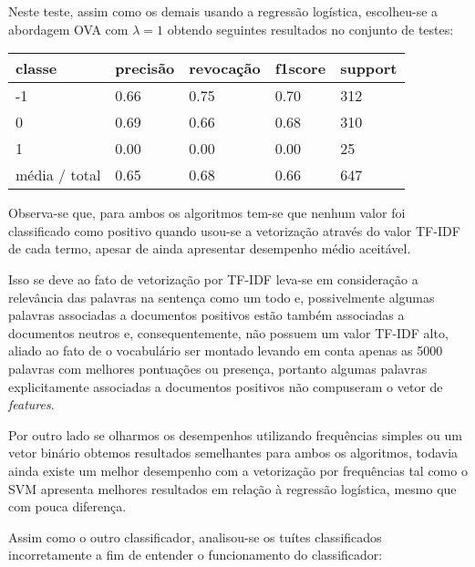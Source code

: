 Neste teste, assim como os demais usando a regressão logística, escolheu-se a abordagem OVA com
$\lambda = 1$ obtendo seguintes resultados no conjunto de testes:

\begin{table}[H]
	\centering
		\begin{tabular}{l | l | l | l | l}
		\hline
		classe  	&	precisão  &  revocação &  f1\-score &  support \\
		\hline
		 -1    &   0.66   &   0.75   &   0.70   &    312 \\
		 \hline
          0    &   0.69   &   0.66   &   0.68   &    310 \\
          \hline
          1    &   0.00   &   0.00   &   0.00    &    25 \\
		\hline
		média / total   &    0.65   &   0.68   &   0.66   &    647 \\
		\hline
	\end{tabular}
\end{table}

Observa-se que, para ambos os algoritmos tem-se que nenhum valor foi classificado como
positivo quando usou-se a vetorização através do valor TF-IDF de cada termo, apesar de ainda
apresentar desempenho médio aceitável. 

Isso se deve ao fato de vetorização por TF-IDF
leva-se em consideração a relevância das palavras na sentença como um todo e, possivelmente
algumas palavras associadas a documentos positivos estão também associadas
a documentos neutros e, consequentemente, não possuem um valor TF-IDF alto, aliado ao fato de o vocabulário
ser montado levando em conta apenas as 5000 palavras com melhores pontuações ou presença, portanto
algumas palavras explicitamente associadas a documentos positivos não compuseram o vetor de
\textit{features}.

Por outro lado se olharmos os desempenhos utilizando frequências simples ou um vetor binário
obtemos resultados semelhantes para ambos os algoritmos, todavia ainda existe um melhor desempenho
com a vetorização por frequências tal como o SVM apresenta melhores resultados em relação à regressão
logística, mesmo que com pouca diferença.

Assim como o outro classificador, analisou-se os tuítes classificados incorretamente a fim de
entender o funcionamento do classificador:

